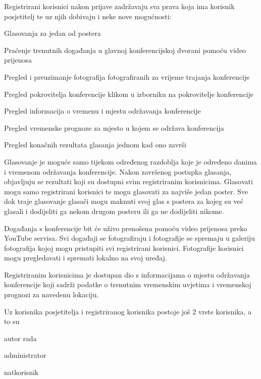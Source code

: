 		Registrirani korisnici nakon prijave zadržavaju sva prava koja ima korisnik posjetitelj te uz njih dobivaju i neke nove mogućnosti:
		\begin{packed_item}
			\item Glasovanja za jedan od postera
			\item Praćenje trenutnih događanja u glavnoj konferencijskoj dvorani pomoću video prijenosa
			\item Pregled i preuzimanje fotografija fotografiranih za vrijeme trajanja konferencije
			\item Pregled pokrovitelja konferencije klikom u izborniku na pokrovitelje konferencije
			\item Pregled informacija o vremenu i mjestu održavanja konferencije
			\item Pregled vremenske prognoze za mjesto u kojem se održava konferencija
			\item Pregled konačnih rezultata glasanja jednom kad ono završi
		\end{packed_item}
		
		Glasovanje je moguće samo tijekom određenog razdoblja koje je određeno danima i vremenom održavanja konferencije. Nakon završenog postupka glasanja, objavljuju se rezultati koji su dostupni svim registriranim korisnicima. Glasovati mogu samo registrirani korisnici te mogu glasovati za najviše jedan poster. Sve dok traje glasovanje glasači mogu maknuti svoj glas s postera za kojeg su već glasali i dodijeliti ga nekom drugom posteru ili ga ne dodijeliti nikome.
		
		Događanja s konferencije bit će uživo prenošena pomoću video prijenosa preko YouTube servisa. Svi događaji se fotografiraju i fotografije se spremaju u galeriju fotografija kojoj mogu pristupiti svi registrirani korisnici. Fotografije korisnici mogu pregledavati i  spremati lokalno na svoj uređaj.
		
		Registriranim korisnicima je dostupan dio s informacijama o mjestu održavanja konferencije koji sadrži podatke o trenutnim vremenskim uvjetima i vremenskoj prognozi za navedenu lokaciju.
		
		Uz korisnika posjetitelja i registriranog korisnika postoje još 2 vrste korisnika, a to su
		\begin{packed_item}
			\item autor rada
			\item administrator
			\item natkorisnik
		\end{packed_item}
		
